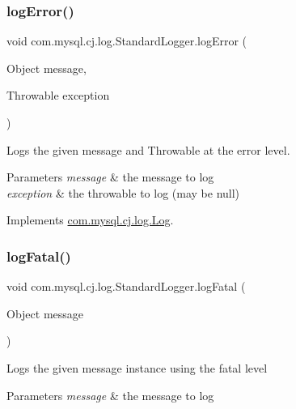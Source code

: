 \subsubsection{\texorpdfstring{log\+Error()}{logError()}\hspace{0.1cm}{\footnotesize\ttfamily [2/2]}}
{\footnotesize\ttfamily void com.\+mysql.\+cj.\+log.\+Standard\+Logger.\+log\+Error (\begin{DoxyParamCaption}\item[{Object}]{message,  }\item[{Throwable}]{exception }\end{DoxyParamCaption})}

Logs the given message and Throwable at the \textquotesingle{}error\textquotesingle{} level.


\begin{DoxyParams}{Parameters}
{\em message} & the message to log \\
\hline
{\em exception} & the throwable to log (may be null) \\
\hline
\end{DoxyParams}


Implements \mbox{\hyperlink{interfacecom_1_1mysql_1_1cj_1_1log_1_1_log_a96aab6e63a2ab9ebe3b640b7e253dd4f}{com.\+mysql.\+cj.\+log.\+Log}}.

\mbox{\label{classcom_1_1mysql_1_1cj_1_1log_1_1_standard_logger_af6f7c3848e7c6df645dd52b95b312aaa}} 
\subsubsection{\texorpdfstring{log\+Fatal()}{logFatal()}\hspace{0.1cm}{\footnotesize\ttfamily [1/2]}}
{\footnotesize\ttfamily void com.\+mysql.\+cj.\+log.\+Standard\+Logger.\+log\+Fatal (\begin{DoxyParamCaption}\item[{Object}]{message }\end{DoxyParamCaption})}

Logs the given message instance using the \textquotesingle{}fatal\textquotesingle{} level


\begin{DoxyParams}{Parameters}
{\em message} & the message to log \\
\hline
\end{DoxyParams}


